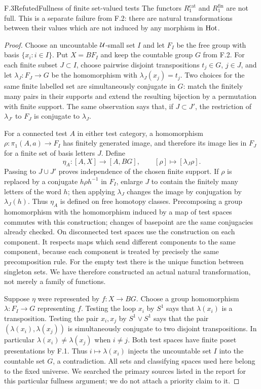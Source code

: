 \begin{claim}{F.3}{Refuted}{Fullness of finite set-valued tests}
The functors $R_1^{\mathrm{cat}}$ and $R_1^{\mathrm{fin}}$ are not full.
This is a separate failure from F.2: there are natural transformations
between their values which are not induced by any morphism in $\mathrm{Hot}$.
\end{claim}
\begin{proof}
Choose an uncountable $\mathcal U$-small set $I$ and let $F_I$ be the free group
with basis $\{x_i:i\in I\}$. Put $X=BF_I$ and keep the countable group
$G$ from F.2. For each finite subset $J\subset I$, choose pairwise
disjoint transpositions $t_j\in G$, $j\in J$, and let
$\lambda_J:F_J\to G$ be the homomorphism with
$\lambda_J(x_j)=t_j$. Two choices for the same finite labelled set are
simultaneously conjugate in $G$: match the finitely many pairs in their
supports and extend the resulting bijection by a permutation with finite
support. The same observation says that, if $J\subset J'$, the
restriction of $\lambda_{J'}$ to $F_J$ is conjugate to $\lambda_J$.

For a connected test $A$ in either test category, a homomorphism
$\rho:\pi_1(A,a)\to F_I$ has finitely generated image, and therefore
its image lies in $F_J$ for a finite set of basis letters $J$. Define
\[
 \eta_A:[A,X]\longrightarrow[A,BG],
 \qquad [\rho]\longmapsto[\lambda_J\rho].
\]
Passing to $J\cup J'$ proves independence of the chosen finite support.
If $\rho$ is replaced by a conjugate $h\rho h^{-1}$ in $F_I$, enlarge
$J$ to contain the finitely many letters of the word $h$; then applying
$\lambda_J$ changes the image by conjugation by $\lambda_J(h)$.
Thus $\eta_A$ is defined on free homotopy classes. Precomposing a
group homomorphism with the homomorphism induced by a map of test
spaces commutes with this construction; changes of basepoint are the
same conjugacies already checked. On disconnected test spaces use the
construction on each component. It respects maps which send different
components to the same component, because each component is treated
by precisely the same precomposition rule. For the empty test there
is the unique function between singleton sets. We have therefore
constructed an actual natural transformation, not merely a family of
functions.

Suppose $\eta$ were represented by $f:X\to BG$. Choose a group
homomorphism $\lambda:F_I\to G$ representing $f$. Testing the loop
$x_i$ by $S^1$ says that $\lambda(x_i)$ is a transposition. Testing
the pair $x_i,x_j$ by $S^1\vee S^1$ says that the pair
$(\lambda(x_i),\lambda(x_j))$ is simultaneously conjugate to two
disjoint transpositions. In particular $\lambda(x_i)\ne\lambda(x_j)$
when $i\ne j$. Both test spaces have finite poset presentations by
F.1. Thus $i\mapsto\lambda(x_i)$ injects the uncountable set $I$ into
the countable set $G$, a contradiction. All sets and classifying
spaces used here belong to the fixed universe. We searched the primary
sources listed in the report for this particular fullness argument;
we do not attach a priority claim to it.
\end{proof}

